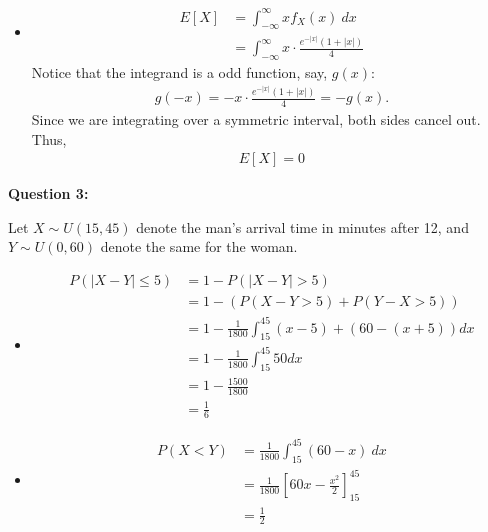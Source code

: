 \documentclass[12pt]{article}
\begin{document}
\begin{itemize}
    \item  [(c)]
          \begin{align*}
              E[X] & = \int_{-\infty}^{\infty} x f_X(x) ~ dx                       \\
                   & = \int_{-\infty}^{\infty} x \cdot \frac{e^{-|x|}(1 + |x|)}{4}
          \end{align*}
          Notice that the integrand is a odd function, say, $g(x)$:
          \begin{align*}
              g(-x) = -x \cdot \frac{e^{-|x|}(1 + |x|)}{4} = -g(x).
          \end{align*}
          Since we are integrating over a symmetric interval, both sides cancel out. Thus,
          \begin{align*}
              E[X] = 0
          \end{align*}
\end{itemize}

\noindent{}\textbf{Question 3:}

Let $X \sim U(15, 45)$ denote the man's arrival time in minutes after 12,
and $Y \sim U(0, 60)$ denote the same for the woman.

\begin{itemize}
    \item [(a)]
          \begin{align*}
              P(|X-Y| \leq 5) & = 1 - P(|X - Y| > 5)                                        \\
                              & = 1 - (P(X - Y > 5) + P(Y - X > 5))                         \\
                              & = 1 - \frac{1}{1800} \int_{15}^{45} (x-5) + (60 - (x+5)) dx \\
                              & = 1 - \frac{1}{1800} \int_{15}^{45} 50 dx                   \\
                              & = 1 - \frac{1500}{1800}                                     \\
                              & = \frac{1}{6}
          \end{align*}
    \item [(b)]
          \begin{align*}
              P(X < Y) & = \frac{1}{1800} \int_{15}^{45} (60-x)~dx                  \\
                       & = \frac{1}{1800} \left[60x -\frac{x^2}{2}\right]_{15}^{45} \\
                       & = \frac{1}{2}
          \end{align*}
\end{itemize}
\end{document}
